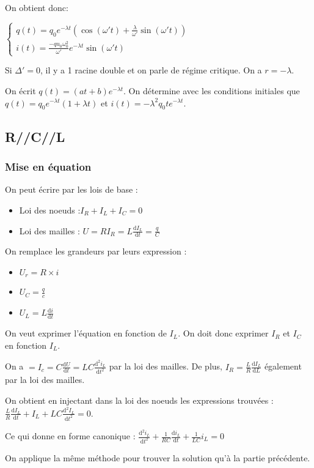 \documentclass[french]{yLectureNote}
\newcommand{\dd}{\mathrm{d}}
\begin{document}
On obtient donc:

\( \left\{\begin{matrix}
q(t) = q_0e^{-\lambda t}(\cos(\omega't)+\frac{\lambda}{\omega'}\sin(\omega't))\\
i(t) = \frac{-qu_0\omega_0^2}{\omega'}e^{-\lambda t}\sin(\omega' t)
\end{matrix}\right.\)

Si \(\Delta'=0\), il y a 1 racine double et on parle de régime critique. On a \(r = -\lambda\).

On écrit \(q(t) = (at+b)e^{-\lambda t}\). On détermine avec les conditions initiales que
\(q(t) = q_0e^{-\lambda t}(1+\lambda t)\) et \(i(t) = -\lambda^2q_0te^{-\lambda t}\).
\subsection{R//C//L}
\subsubsection{Mise en équation}
On peut écrire par les lois de base :
\begin{itemize}
 \item Loi des noeuds :\(I_R+I_L+I_C=0\)
 \item Loi des mailles : \(U = RI_R = L\frac{\dd I_L}{\dd t} = \frac{q}{C}\)
\end{itemize}
On remplace les grandeurs par leurs expression :
\begin{itemize}
 \item $U_r = R\times i$
 \item $U_C = \frac{q}{c}$
 \item $U_L = L\frac{\dd i}{\dd t}$
\end{itemize}
On veut exprimer l'équation en fonction de \(I_L\). On doit donc exprimer $I_R$ et $I_C$ en fonction $I_L$.

On a \( = I_c = C\frac{\dd U}{\dd t} = LC\frac{\dd^2 i_L}{\dd t^2}\) par la loi des mailles. De plus, \(I_R = \frac{L}{R}\frac{\dd I_L}{\dd L}\) également par la loi des mailles.

On obtient en injectant dans la loi des noeuds les expressions trouvées : \(\frac{L}{R}\frac{\dd I_L}{\dd t}+I_L+LC\frac{\dd^2 I_L}{\dd t^2} = 0\).

Ce qui donne en forme canonique : \(\frac{\dd^2 i_L}{\dd t^2} + \frac{1}{RC}\frac{\dd i_L}{\dd t} + \frac{1}{LC}i_L = 0\)

On applique la m\^eme méthode pour trouver la solution qu'à la partie précédente.
\end{document}
